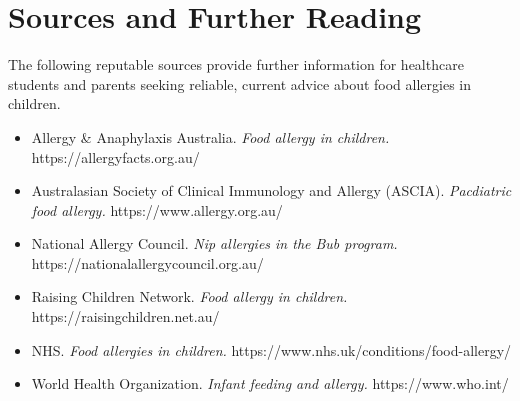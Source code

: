 \section*{Sources and Further Reading}
The following reputable sources provide further information for healthcare students and parents seeking reliable, current advice about food allergies in children.
\begin{itemize}
    \item Allergy \& Anaphylaxis Australia. \textit{Food allergy in children.} https://allergyfacts.org.au/
    \item Australasian Society of Clinical Immunology and Allergy (ASCIA). \textit{Pacdiatric food allergy.} https://www.allergy.org.au/
    \item National Allergy Council. \textit{Nip allergies in the Bub program.} https://nationalallergycouncil.org.au/
    \item Raising Children Network. \textit{Food allergy in children.} https://raisingchildren.net.au/
    \item NHS. \textit{Food allergies in children.} https://www.nhs.uk/conditions/food-allergy/
    \item World Health Organization. \textit{Infant feeding and allergy.} https://www.who.int/
\end{itemize}
